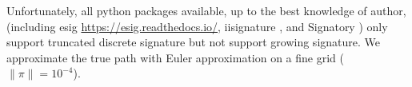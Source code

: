 \documentclass[12pt]{report}
\theoremstyle{definition}
\theoremstyle{remark}
\begin{document}
Unfortunately, all python packages available, up to the best knowledge of author, (including esig \url{https://esig.readthedocs.io/}, iisignature \cite{reizenstein2018iisignature}, and Signatory \cite{kidger2020signatory}) only support truncated discrete signature but not support growing signature. We approximate the true path with Euler approximation on a fine grid ($\lVert\pi\rVert = 10^{-4}$).
\end{document}
